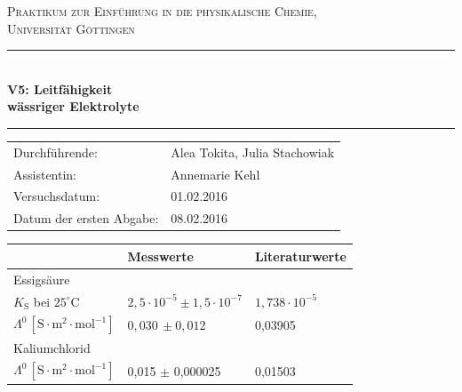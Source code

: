 \documentclass[12pt,a4paper,titlepage,headinclude,bibtotoc]{scrartcl}
\begin{document}
\begin{titlepage}
\centering
\textsc{\Large Praktikum zur Einführung in die physikalische Chemie,\\[1.5ex] Universität Göttingen}

\vspace*{0.5cm}

\rule{\textwidth}{1pt}\\[0.5cm]
{\huge \bfseries
  V5: Leitfähigkeit\\[1.5ex]
  wässriger Elektrolyte}\\[0.5cm]
\rule{\textwidth}{1pt}

\vspace*{0.5cm}


\begin{Large}
\begin{tabular}{ll}
Durchführende: &  Alea Tokita, Julia Stachowiak\\
Assistentin: & Annemarie Kehl\\
 Versuchsdatum: & 01.02.2016\\
 Datum der ersten Abgabe: & 08.02.2016\\

\end{tabular}
\end{Large}

\vspace*{1cm}
\begin{large}
\begin{table} [h]
\centering 
\begin{tabular}{p{3cm}|p{5cm}p{5cm}}
& Messwerte & Literaturwerte\footnotemark\\
\hline
Essigsäure & &\\
 $K_{\mathrm{S}}$  bei $25^\circ\text{C}$ & $2,5 \cdot 10^{-5} \pm 1,5 \cdot 10^{-7}$& $1,738 \cdot 10^{-5}$\\
$\Lambda^0\, [\mathrm{S} \cdot \mathrm{m^2} \cdot \mathrm{mol^{-1}}]$ & $ 0,030\, \pm 0,012 $& 0,03905\\
\hline
Kaliumchlorid & &\\
$\Lambda^0\, [\mathrm{S} \cdot \mathrm{m^2} \cdot \mathrm{mol^{-1}}]$ & 0,015 $\pm$ 0,000025 & 0,01503\\
\end{tabular}
\end{table}
\end{large}


\end{titlepage}
\end{document}
